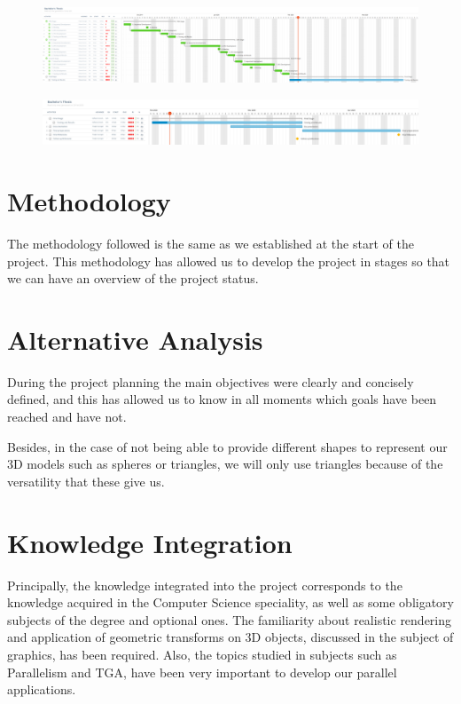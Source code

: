 \documentclass[titlepage,12pt]{article}
\begin{document}
\begin{figure}[H]
	\centering
  	\includegraphics[scale=0.25]{media/gantt_dev_eng_new.png}
  	\label{gantt_3}
\end{figure}

\begin{figure}[H]
	\centering
  	\includegraphics[scale=0.25]{media/gantt_final_eng.png}
  	\label{gantt_4}
\end{figure}

\useportrait

\section{Methodology}

The methodology followed is the same as we established at the start of the project. This methodology has allowed us to develop the project in stages so that we can have an overview of the project status.

\section{Alternative Analysis}

During the project planning the main objectives were clearly and concisely defined, and this has allowed us to know in all moments which goals have been reached and have not.

Besides, in the case of not being able to provide different shapes to represent our 3D models such as spheres or triangles, we will only use triangles because of the versatility that these give us.

\section{Knowledge Integration}

Principally, the knowledge integrated into the project corresponds to the knowledge acquired in the Computer Science speciality, as well as some obligatory subjects of the degree and optional ones. The familiarity about realistic rendering and application of geometric transforms on 3D objects, discussed in the subject of graphics, has been required. Also, the topics studied in subjects such as Parallelism and TGA, have been very important to develop our parallel applications.
\end{document}
